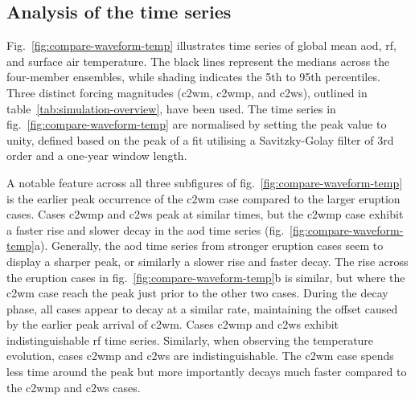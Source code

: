 \documentclass{ametsocV6.1}
\begin{document}

\subsection{Analysis of the time series}

Fig.~\ref{fig:compare-waveform-temp} illustrates time series of global mean \gls{aod},
\gls{rf}, and surface air temperature. The black lines represent the medians across the
four-member ensembles, while shading indicates the 5th to 95th percentiles. Three
distinct forcing magnitudes (\gls{c2wm}, \gls{c2wmp}, and \gls{c2ws}), outlined in
table~\ref{tab:simulation-overview}, have been used. The time series in
fig.~\ref{fig:compare-waveform-temp} are normalised by setting the peak value to unity,
defined based on the peak of a fit utilising a Savitzky-Golay filter of 3rd order and a
one-year window length.

A notable feature across all three subfigures of fig.~\ref{fig:compare-waveform-temp} is
the earlier peak occurrence of the \gls{c2wm} case compared to the larger eruption
cases. Cases \gls{c2wmp} and \gls{c2ws} peak at similar times, but the \gls{c2wmp} case
exhibit a faster rise and slower decay in the \gls{aod} time series
(fig.~\ref{fig:compare-waveform-temp}a). Generally, the \gls{aod} time series from
stronger eruption cases seem to display a sharper peak, or similarly a slower rise and
faster decay. The rise across the eruption cases in
fig.~\ref{fig:compare-waveform-temp}b is similar, but where the \gls{c2wm} case reach
the peak just prior to the other two cases. During the decay phase, all cases appear to
decay at a similar rate, maintaining the offset caused by the earlier peak arrival of
\gls{c2wm}. Cases \gls{c2wmp} and \gls{c2ws} exhibit indistinguishable \gls{rf} time
series. Similarly, when observing the temperature evolution, cases \gls{c2wmp} and
\gls{c2ws} are indistinguishable. The \gls{c2wm} case spends less time around the peak
but more importantly decays much faster compared to the \gls{c2wmp} and \gls{c2ws}
cases.
\end{document}
